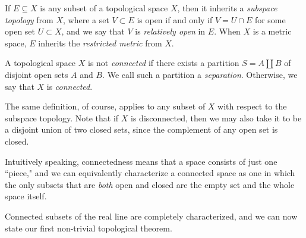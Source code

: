 If $E \subseteq X$ is any subset of a topological space $X$, then it inherits a \emph{subspace topology} from $X$, where a set $V \subset E$ is open if and only if $V=U \cap E$ for some open set $U \subset X$, and we say that $V$ is \emph{relatively open} in $E$. When $X$ is a metric space, $E$ inherits the \emph{restricted metric} from $X$.

\begin{definition}
	A topological space $X$ is not \emph{connected} if there exists a partition $S=A \coprod B$ of disjoint open sets $A$ and $B$. We call such a partition a \emph{separation}. Otherwise, we say that $X$ is \emph{connected}.
\end{definition}

The same definition, of course, applies to any subset of $X$ with respect to the subspace topology. Note that if $X$ is disconnected, then we may also take it to be a disjoint union of two closed sets, since the complement of any open set is closed.

Intuitively speaking, connectedness means that a space consists of just one ``piece," and we can equivalently characterize a connected space as one in which the only subsets that are \textit{both} open and closed are the empty set and the whole space itself.

Connected subsets of the real line are completely characterized, and we can now state our first non-trivial topological theorem.

